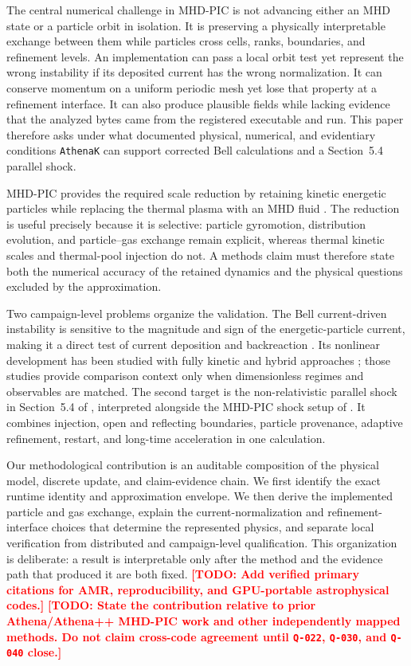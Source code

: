 \documentclass[twocolumn]{aastex701}
\newcommand{\athenak}{\texttt{AthenaK}\xspace}
\newcommand{\TODO}[1]{\textcolor{red}{\textbf{[TODO: #1]}}}
\newcommand{\qgate}[1]{\texttt{#1}}
\begin{document}
The central numerical challenge in MHD-PIC is not advancing either an MHD
state or a particle orbit in isolation. It is preserving a physically
interpretable exchange between them while particles cross cells, ranks,
boundaries, and refinement levels. An implementation can pass a local orbit
test yet represent the wrong instability if its deposited current has the
wrong normalization. It can conserve momentum on a uniform periodic mesh yet
lose that property at a refinement interface. It can also produce plausible
fields while lacking evidence that the analyzed bytes came from the registered
executable and run. This paper therefore asks under what documented physical,
numerical, and evidentiary conditions \athenak can support corrected Bell
calculations and a Section~5.4 parallel shock.

MHD-PIC provides the required scale reduction by retaining kinetic energetic
particles while replacing the thermal plasma with an MHD fluid
\citep{BaiEtAl2015,MignoneEtAl2018,vanMarleEtAl2018,SunBai2023}. The reduction
is useful precisely because it is selective: particle gyromotion,
distribution evolution, and particle--gas exchange remain explicit, whereas
thermal kinetic scales and thermal-pool injection do not. A methods claim must
therefore state both the numerical accuracy of the retained dynamics and the
physical questions excluded by the approximation.

Two campaign-level problems organize the validation. The Bell current-driven
instability is sensitive to the magnitude and sign of the energetic-particle
current, making it a direct test of current deposition and backreaction
\citep{Bell2004}. Its nonlinear development has been studied with fully
kinetic and hybrid approaches \citep{RiquelmeSpitkovsky2009,GargateEtAl2010,
ZacharegkasEtAl2024}; those studies provide comparison context only when
dimensionless regimes and observables are matched. The second target is the
non-relativistic parallel shock in Section~5.4 of \citet{SunBai2023},
interpreted alongside the MHD-PIC shock setup of \citet{BaiEtAl2015}. It
combines injection, open and reflecting boundaries, particle provenance,
adaptive refinement, restart, and long-time acceleration in one calculation.

Our methodological contribution is an auditable composition of the physical
model, discrete update, and claim-evidence chain. We first identify the exact
runtime identity and approximation envelope. We then derive the implemented
particle and gas exchange, explain the current-normalization and
refinement-interface choices that determine the represented physics, and
separate local verification from distributed and campaign-level
qualification. This organization is deliberate: a result is interpretable
only after the method and the evidence path that produced it are both fixed.
\TODO{Add verified primary citations for AMR, reproducibility, and GPU-portable
astrophysical codes.}
\TODO{State the contribution relative to prior Athena/Athena++ MHD-PIC work and
other independently mapped methods. Do not claim cross-code agreement until
\qgate{Q-022}, \qgate{Q-030}, and \qgate{Q-040} close.}
\end{document}
